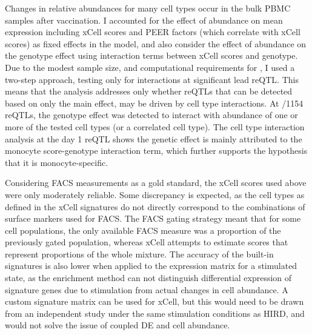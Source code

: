 Changes in relative abundances for many cell types occur in the bulk PBMC samples after vaccination.
I accounted for the effect of abundance on mean expression including xCell scores and PEER factors (which correlate with xCell scores) as fixed effects in the model,
and also consider the effect of abundance on the genotype effect using interaction terms between xCell scores and genotype.
Due to the modest sample size, and computational requirements for , I used a two-step approach, testing only for interactions at significant lead \gls{reQTL}.
This means that the analysis addresses only whether reQTLs that can be detected based on only the main effect, may be driven by cell type interactions.
At \todo{}/1154 reQTLs, the genotype effect was detected to interact with abundance of one or more of the tested cell types (or a correlated cell type).
The cell type interaction analysis at the day 1  reQTL shows the genetic effect is mainly attributed to the monocyte score-genotype interaction term, which further supports the hypothesis that it is monocyte-specific.

Considering FACS measurements as a gold standard, the xCell scores used above were only moderately reliable.
Some discrepancy is expected, as the cell types as defined in the xCell signatures do not directly correspond to the combinations of surface markers used for FACS.
The FACS gating strategy meant that for some cell populations, the only available FACS measure was a proportion of the previously gated population,
whereas xCell attempts to estimate scores that represent proportions of the whole mixture.
The accuracy of the built-in signatures is also lower when applied to the expression matrix for a stimulated state,
as the enrichment method can not distinguish differential expression of signature genes due to stimulation from actual changes in cell abundance.
A custom signature matrix can be used for xCell, but this would need to be drawn from an independent study under the same stimulation conditions as \gls{HIRD}, and would not solve the issue of coupled DE and cell abundance.

